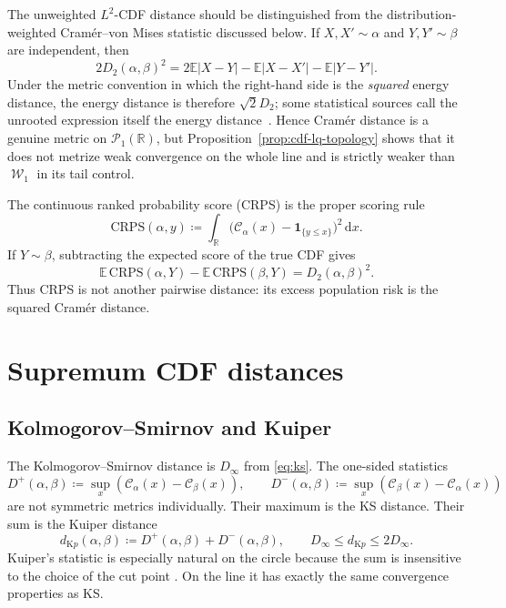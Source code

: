 \documentclass[11pt]{article}
\newcommand{\RR}{\mathbb R}
\newcommand{\Pp}{\mathcal P}
\newcommand{\EE}{\mathbb E}
\renewcommand{\d}{\,\mathrm d}
\newcommand{\al}{\alpha}
\newcommand{\be}{\beta}
\newcommand{\Cc}{\mathcal C}
\newcommand{\cumul}[1]{\Cc_{#1}}
\DeclareMathOperator{\Wass}{\mathcal W}
\newcommand{\eqdef}{\coloneqq}
\newcommand{\one}{\mathbf 1}
\begin{document}
The unweighted $L^2$-CDF distance should be distinguished from the
distribution-weighted Cram\'er--von Mises statistic discussed below.  If
$X,X'\sim\al$ and $Y,Y'\sim\be$ are independent, then
\begin{equation}\label{eq:cramer-energy}
 2D_2(\al,\be)^2
 =2\EE|X-Y|-\EE|X-X'|-\EE|Y-Y'|.
\end{equation}
Under the metric convention in which the right-hand side is the
\emph{squared} energy distance, the energy distance is therefore
$\sqrt2D_2$; some statistical sources call the unrooted expression itself
the energy distance~\cite{SzekelyRizzo2013}.  Hence Cram\'er distance is a
genuine metric on $\Pp_1(\RR)$, but Proposition~\ref{prop:cdf-lq-topology}
shows that it does not metrize weak convergence on the whole line and is
strictly weaker than $\Wass_1$ in its tail control.

The continuous ranked probability score (CRPS) is the proper scoring rule
\begin{equation*}
 \mathrm{CRPS}(\al,y)\eqdef\int_\RR
   \big(\cumul{\al}(x)-\one_{\{y\leq x\}}\big)^2\d x.
\end{equation*}
If $Y\sim\be$, subtracting the expected score of the true CDF gives
\begin{equation}\label{eq:crps-cramer}
 \EE\,\mathrm{CRPS}(\al,Y)
 -\EE\,\mathrm{CRPS}(\be,Y)
 =D_2(\al,\be)^2.
\end{equation}
Thus CRPS is not another pairwise distance: its excess population risk is the
squared Cram\'er distance.

\section{Supremum CDF distances}

\subsection{Kolmogorov--Smirnov and Kuiper}

The Kolmogorov--Smirnov distance is $D_\infty$ from \eqref{eq:ks}.  The
one-sided statistics
\begin{equation*}
 D^+(\al,\be)\eqdef\sup_x(\cumul{\al}(x)-\cumul{\be}(x)),
 \qquad
 D^-(\al,\be)\eqdef\sup_x(\cumul{\be}(x)-\cumul{\al}(x))
\end{equation*}
are not symmetric metrics individually.  Their maximum is the KS distance.
Their sum is the Kuiper distance
\begin{equation}\label{eq:kuiper}
 d_{\mathrm Kp}(\al,\be)\eqdef D^+(\al,\be)+D^-(\al,\be),
 \qquad
 D_\infty\leq d_{\mathrm Kp}\leq2D_\infty.
\end{equation}
Kuiper's statistic is especially natural on the circle because the sum is
insensitive to the choice of the cut point \cite{Kuiper1960}.  On the line it
has exactly the same convergence properties as KS.
\end{document}
